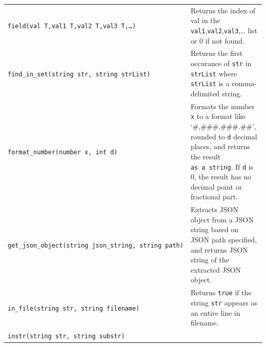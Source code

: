 \documentclass[
]{article}
\begin{document}
\begin{longtable}[]{@{}ll@{}}
\begin{minipage}[t]{0.39\columnwidth}
\texttt{field(val\ T,val1\ T,val2\ T,val3\ T,\ldots{})}\strut
\end{minipage} & \begin{minipage}[t]{0.55\columnwidth}\raggedright
Returns the index of val in the
\texttt{val1},\texttt{val2},\texttt{val3},\ldots{} list or 0 if not
found.\strut
\end{minipage}\tabularnewline
\begin{minipage}[t]{0.39\columnwidth}\raggedright
\texttt{find\_in\_set(string\ str,\ string\ strList)}\strut
\end{minipage} & \begin{minipage}[t]{0.55\columnwidth}\raggedright
Returns the first occurance of \texttt{str} in \texttt{strList} where
\texttt{strList} is a comma-delimited string.\strut
\end{minipage}\tabularnewline
\begin{minipage}[t]{0.39\columnwidth}\raggedright
\texttt{format\_number(number\ x,\ int\ d)}\strut
\end{minipage} & \begin{minipage}[t]{0.55\columnwidth}\raggedright
Formats the number \texttt{x} to a format like `\#,\#\#\#,\#\#\#.\#\#',
rounded to \texttt{d} decimal places, and returns the result
\texttt{as\ a\ string}. If \texttt{d} is 0, the result has no decimal
point or fractional part.\strut
\end{minipage}\tabularnewline
\begin{minipage}[t]{0.39\columnwidth}\raggedright
\texttt{get\_json\_object(string\ json\_string,\ string\ path)}\strut
\end{minipage} & \begin{minipage}[t]{0.55\columnwidth}\raggedright
Extracts JSON object from a JSON string based on JSON path specified,
and returns JSON string of the extracted JSON object.\strut
\end{minipage}\tabularnewline
\begin{minipage}[t]{0.39\columnwidth}\raggedright
\texttt{in\_file(string\ str,\ string\ filename)}\strut
\end{minipage} & \begin{minipage}[t]{0.55\columnwidth}\raggedright
Returns \texttt{true} if the string \texttt{str} appears as an entire
line in filename.\strut
\end{minipage}\tabularnewline
\begin{minipage}[t]{0.39\columnwidth}\raggedright
\texttt{instr(string\ str,\ string\ substr)}\strut
\end{minipage} & \begin{minipage}[t]{0.55\columnwidth}\raggedright

\end{minipage}
\end{longtable}
\end{document}
